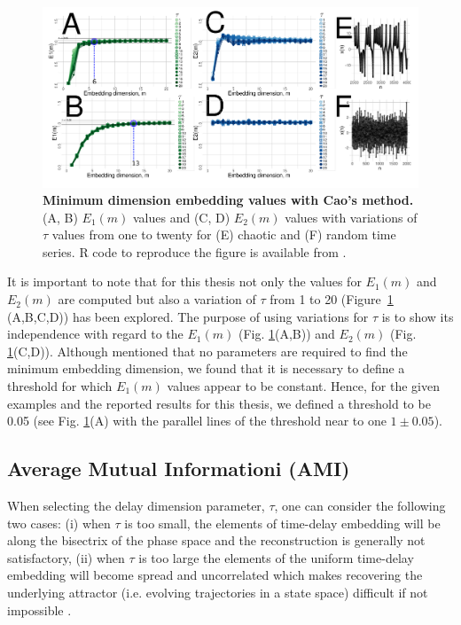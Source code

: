 \begin{figure}[!h]
  \centering
  \includegraphics[width=1.0\textwidth]{cao}
    \caption{
	{\bf Minimum dimension embedding values with Cao's method.} 
	(A, B) $E_1 (m)$ values and (C, D) $E_2(m)$ values 
	with variations of $\tau$ values from one to twenty
	for (E) chaotic and (F) random time series.
	R code to reproduce the figure is available from \cite{hwum2018}.
        }
    \label{fig:e1e2}
\end{figure}

It is important to note that for this thesis not only the values for 
$E_1(m)$ and $E_2(m)$ are computed but also a variation of $\tau$ from 
1 to 20 (Figure~\ref{fig:e1e2} (A,B,C,D)) has been explored. 
The purpose of using variations for $\tau$ is to show its independence 
with regard to the $E_1(m)$ (Fig. \ref{fig:e1e2}(A,B))
and $E_2(m)$ (Fig. \ref{fig:e1e2}(C,D)).
Although \cite{Cao1997} mentioned that no parameters are required to find
the minimum embedding dimension, we found that it is necessary to define a  
threshold for which $E_1(m)$ values appear to be constant. 
Hence, for the given examples and the reported results for this thesis, 
we defined a threshold to be 0.05 
(see Fig. \ref{fig:e1e2}(A) with the parallel lines of the threshold 
near to one $1\pm0.05$).


\subsection{Average Mutual Informationi (AMI)}
When selecting the delay dimension parameter, $\tau$, one can consider the 
following two cases:
(i) when $\tau$ is too small, the elements of time-delay embedding will be 
along the bisectrix of the phase space and the reconstruction is generally 
not satisfactory, 
(ii) when $\tau$ is too large the elements of the uniform 
time-delay embedding will become spread and uncorrelated which makes 
recovering the underlying attractor (i.e. evolving trajectories in a 
state space) difficult if not impossible 
\citep{casdagli1991, emrani2014a, garcia2005e71}.

